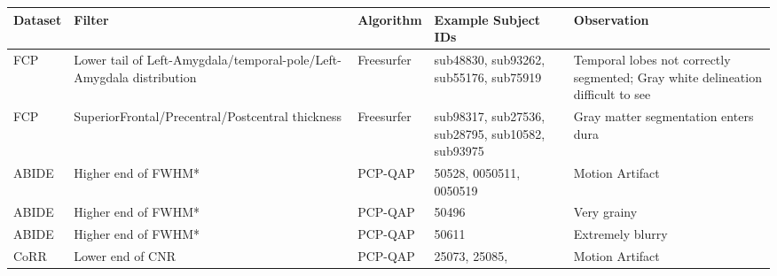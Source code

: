 \begin{tabular}{ | l | l | p{5cm} | p{5cm} | p{5cm} | }
\hline
	Dataset & Filter & Algorithm & Example Subject IDs & Observation \\ \hline
	FCP & Lower tail of Left-Amygdala/temporal-pole/Left-Amygdala distribution & Freesurfer & sub48830, sub93262, sub55176, sub75919 & Temporal lobes not correctly segmented; Gray white delineation difficult to see \\ \hline
	FCP & SuperiorFrontal/Precentral/Postcentral thickness & Freesurfer & sub98317, sub27536, sub28795, sub10582, sub93975 & Gray matter segmentation enters dura \\ \hline
	ABIDE & Higher end of FWHM* & PCP-QAP & 50528, 0050511, 0050519 & Motion Artifact \\ \hline
	ABIDE & Higher end of FWHM* & PCP-QAP & 50496 & Very grainy \\ \hline
	ABIDE & Higher end of FWHM* & PCP-QAP & 50611 & Extremely blurry \\ \hline
	CoRR & Lower end of CNR & PCP-QAP & 25073, 25085, & Motion Artifact \\ \hline

\end{tabular}
